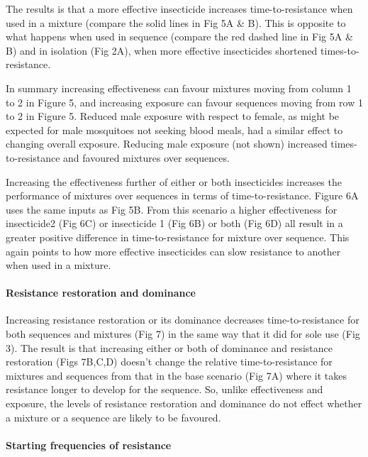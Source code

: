 \documentclass[11pt,]{article}
\let\oldparagraph\paragraph
\renewcommand{\paragraph}[1]{\oldparagraph{#1}\mbox{}}
\begin{document}
The results is that a more effective insecticide increases
time-to-resistance when used in a mixture (compare the solid lines in
Fig 5A \& B). This is opposite to what happens when used in sequence
(compare the red dashed line in Fig 5A \& B) and in isolation (Fig 2A),
when more effective insecticides shortened times-to-resistance.

In summary increasing effectiveness can favour mixtures moving from
column 1 to 2 in Figure 5, and increasing exposure can favour sequences
moving from row 1 to 2 in Figure 5. Reduced male exposure with respect
to female, as might be expected for male mosquitoes not seeking blood
meals, had a similar effect to changing overall exposure. Reducing male
exposure (not shown) increased times-to-resistance and favoured mixtures
over sequences.

Increasing the effectiveness further of either or both insecticides
increases the performance of mixtures over sequences in terms of
time-to-resistance. Figure 6A uses the same inputs as Fig 5B. From this
scenario a higher effectiveness for insecticide2 (Fig 6C) or insecticide
1 (Fig 6B) or both (Fig 6D) all result in a greater positive difference
in time-to-resistance for mixture over sequence. This again points to
how more effective insecticides can slow resistance to another when used
in a mixture.

\paragraph{Resistance restoration and
dominance}\label{resistance-restoration-and-dominance}

Increasing resistance restoration or its dominance decreases
time-to-resistance for both sequences and mixtures (Fig 7) in the same
way that it did for sole use (Fig 3). The result is that increasing
either or both of dominance and resistance restoration (Figs 7B,C,D)
doesn't change the relative time-to-resistance for mixtures and
sequences from that in the base scenario (Fig 7A) where it takes
resistance longer to develop for the sequence. So, unlike effectiveness
and exposure, the levels of resistance restoration and dominance do not
effect whether a mixture or a sequence are likely to be favoured.

\paragraph{Starting frequencies of
resistance}\label{starting-frequencies-of-resistance}
\end{document}

